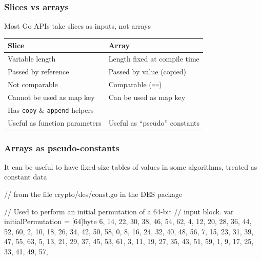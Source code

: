 \documentclass[handout,compress,t,11pt]{beamer}
\begin{document}
\begin{frame}[fragile]
    \frametitle{Slices vs arrays}
    Most Go APIs take slices as inputs, not arrays
\begin{center}
\begin{table}[h!]
{\renewcommand{\arraystretch}{1.7}%
    \begin{tabular}{l|l}
    \textbf{Slice} & \textbf{Array} \\
    \hline
    Variable length & Length fixed at compile time  \\
    Passed by reference & Passed by value (copied) \\
    Not comparable & Comparable ({\tt ==})  \\
    Cannot be used as map key  & Can be used as map key \\
    Has {\tt copy} \& {\tt append} helpers & --- \\
    Useful as function parameters & Useful as ``pseudo'' constants \\
    \end{tabular}}
\end{table}
\end{center}
\end{frame}

\begin{frame}[fragile]
    \frametitle{Arrays as pseudo-constants}
    It can be useful to have fixed-size tables of values in
    some algorithms, treated as constant data
\begin{golang}
// from the file crypto/des/const.go in the DES package

// Used to perform an initial permutation of a 64-bit 
// input block.
var initialPermutation = [64]byte{
	6, 14, 22, 30, 38, 46, 54, 62,
	4, 12, 20, 28, 36, 44, 52, 60,
	2, 10, 18, 26, 34, 42, 50, 58,
	0,  8, 16, 24, 32, 40, 48, 56,
	7, 15, 23, 31, 39, 47, 55, 63,
	5, 13, 21, 29, 37, 45, 53, 61,
	3, 11, 19, 27, 35, 43, 51, 59,
	1,  9, 17, 25, 33, 41, 49, 57,
}
\end{golang}
\end{frame}
\end{document}
